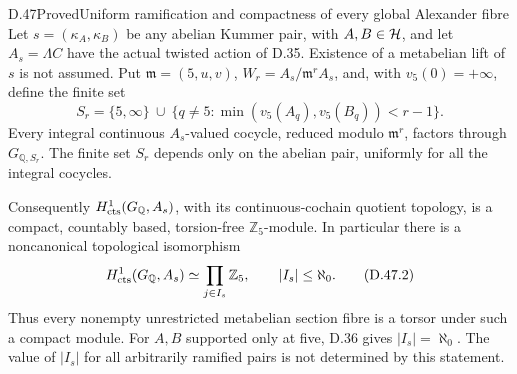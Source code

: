 \begin{statement}{D.47}{Proved}{Uniform ramification and compactness of every global Alexander fibre}
Let \(s=(\kappa_A,\kappa_B)\) be any abelian Kummer
pair, with \(A,B\in{\cal H}\), and let \(A_s=\Lambda C\)
have the actual twisted action of D.35.
Existence of a metabelian lift of \(s\) is not assumed.
Put \(\mathfrak m=(5,u,v)\), \(W_r=A_s/\mathfrak m^rA_s\),
and, with \(v_5(0)=+\infty\), define the finite set
\[
 S_r=\{5,\infty\}\ \cup\
       \{q\ne5:\min(v_5(A_q),v_5(B_q))<r-1\}.
                                                               \tag{D.47.1}
\]
Every integral continuous \(A_s\)-valued cocycle,
reduced modulo \(\mathfrak m^r\), factors through
\(G_{\mathbb Q,S_r}\). The finite set \(S_r\)
depends only on the abelian pair, uniformly
for all the integral cocycles.

Consequently \(H^1_{\rm cts}(G_{\mathbb Q},A_s)\),
with its continuous-cochain quotient topology,
is a compact, countably based, torsion-free
\(\mathbb Z_5\)-module. In particular there is
a noncanonical topological isomorphism
\[
 H^1_{\rm cts}(G_{\mathbb Q},A_s)
                \simeq\prod_{j\in I_s}\mathbb Z_5,
                    \qquad |I_s|\le\aleph_0 .                  \tag{D.47.2}
\]
Thus every nonempty unrestricted metabelian
section fibre is a torsor under such a compact
module. For \(A,B\) supported only at five,
D.36 gives \(|I_s|=\aleph_0\).
The value of \(|I_s|\) for all arbitrarily
ramified pairs is not determined by this
statement.
\end{statement}
